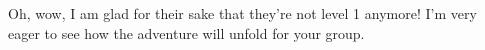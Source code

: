 Oh, wow, I am glad for their sake that they're not level 1 anymore! I'm very eager to see how the adventure will unfold for your group.\\

